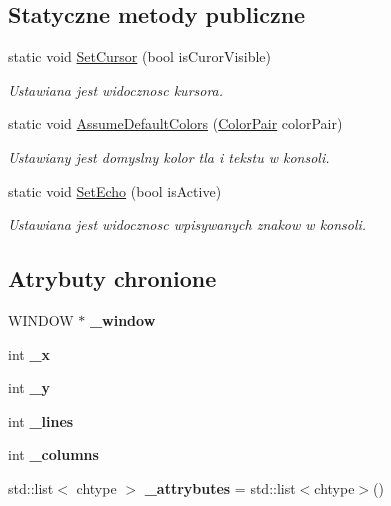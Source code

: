 \subsection*{Statyczne metody publiczne}
\begin{DoxyCompactItemize}
\item 
static void \hyperlink{class_window_aa236ccfebd21bb8283f530cb5b7fab89}{Set\+Cursor} (bool is\+Curor\+Visible)
\begin{DoxyCompactList}\small\item\em Ustawiana jest widocznosc kursora. \end{DoxyCompactList}\item 
static void \hyperlink{class_window_a7b1725e57ac5d7b5a90661fa0bad373e}{Assume\+Default\+Colors} (\hyperlink{class_color_pair}{Color\+Pair} color\+Pair)
\begin{DoxyCompactList}\small\item\em Ustawiany jest domyslny kolor tla i tekstu w konsoli. \end{DoxyCompactList}\item 
static void \hyperlink{class_window_ad89f757546282b04fc640146750aff22}{Set\+Echo} (bool is\+Active)
\begin{DoxyCompactList}\small\item\em Ustawiana jest widocznosc wpisywanych znakow w konsoli. \end{DoxyCompactList}\end{DoxyCompactItemize}
\subsection*{Atrybuty chronione}
\begin{DoxyCompactItemize}
\item 
\hypertarget{class_window_a6b8554b20546907c275c7ad61a529aa2}{}W\+I\+N\+D\+O\+W $\ast$ {\bfseries \+\_\+window}\label{class_window_a6b8554b20546907c275c7ad61a529aa2}

\item 
\hypertarget{class_window_af907a6d65dbddffb8e58e162e22472e3}{}int {\bfseries \+\_\+x}\label{class_window_af907a6d65dbddffb8e58e162e22472e3}

\item 
\hypertarget{class_window_a40112a204e3a41a989ab7d4d55107390}{}int {\bfseries \+\_\+y}\label{class_window_a40112a204e3a41a989ab7d4d55107390}

\item 
\hypertarget{class_window_a7a08a07989f3c7f061a01a279c1f7de1}{}int {\bfseries \+\_\+lines}\label{class_window_a7a08a07989f3c7f061a01a279c1f7de1}

\item 
\hypertarget{class_window_a1b6d1a10dbdf2d136428bca807d074a2}{}int {\bfseries \+\_\+columns}\label{class_window_a1b6d1a10dbdf2d136428bca807d074a2}

\item 
\hypertarget{class_window_ac233c371c76b0b5cf81ab30de683c79a}{}std\+::list$<$ chtype $>$ {\bfseries \+\_\+attrybutes} = std\+::list$<$chtype$>$()\label{class_window_ac233c371c76b0b5cf81ab30de683c79a}

\end{DoxyCompactItemize}
